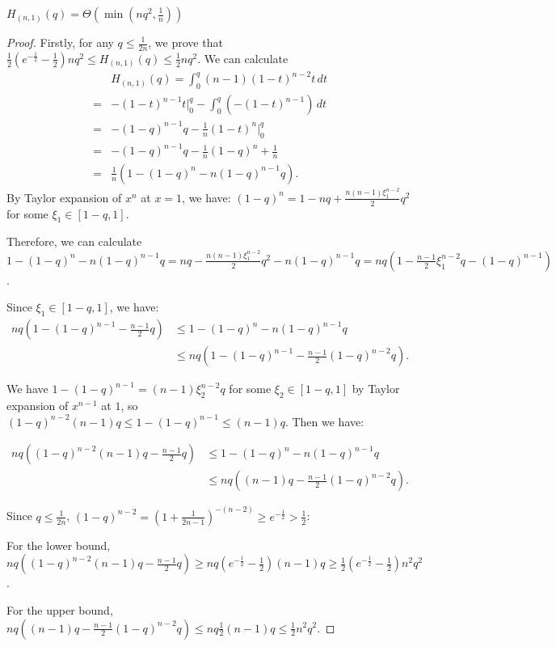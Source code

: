 \begin{lemma}\label{lem:Hn1}
    $H_{(n,1)}(q)=\Theta(\min(nq^2,\frac1{n}))$
\end{lemma}
\begin{proof}
   Firstly, for any $q\leq \frac1{2n}$, we prove that $\frac12(e^{-\frac12}-\frac12)nq^2\leq H_{(n,1)}(q)\leq \frac12nq^2$. We can calculate
   \begin{align*}
       &H_{(n,1)}(q)=\int_0^q (n-1) (1-t)^{n-2} t \, dt\\
=& -(1-t)^{n-1} t \Big|_0^q - \int_0^q \left( -(1-t)^{n-1} \right) \, dt\\
=& -(1-q)^{n-1} q - \frac{1}{n} (1-t)^n \Big|_0^q\\
=& -(1-q)^{n-1} q - \frac{1}{n} (1-q)^n + \frac{1}{n}\\
=& \frac{1}{n} \left( 1 - (1-q)^n - n(1-q)^{n-1} q \right).
   \end{align*}
    By Taylor expansion of $x^n$ at $x=1$, we have: $(1-q)^n=1-nq+\frac{n(n-1)\xi_1^{n-2}}{2}q^2$ for some $\xi_1\in[1-q,1]$.
    
   Therefore, we can calculate $1 - (1-q)^n - n(1-q)^{n-1} q
   =nq-\frac{n(n-1)\xi_1^{n-2}}{2}q^2-n(1-q)^{n-1} q
   =nq(1-\frac{n-1}{2}\xi_1^{n-2}q-(1-q)^{n-1})$. 
   
   Since $\xi_1\in[1-q,1]$, we have: 
   $$
   \begin{aligned}
       nq(1-(1-q)^{n-1}-\frac{n-1}{2}q) & \leq 1 - (1-q)^n - n(1-q)^{n-1} q\\ & \leq nq(1-(1-q)^{n-1}-\frac{n-1}{2}(1-q)^{n-2}q).
   \end{aligned}
   $$
   
   We have $1-(1-q)^{n-1}=(n-1)\xi_2^{n-2}q$ for some $\xi_2\in[1-q,1]$ by Taylor expansion of $x^{n-1}$ at $1$, so $(1-q)^{n-2}(n-1)q\leq 1-(1-q)^{n-1}\leq (n-1)q$. Then we have:
   
   $$
   \begin{aligned}
       nq((1-q)^{n-2}(n-1)q-\frac{n-1}{2}q) & \leq 1 - (1-q)^n - n(1-q)^{n-1} q \\ &\leq nq((n-1)q-\frac{n-1}{2}(1-q)^{n-2}q).
   \end{aligned}
   $$
   
   Since $q\leq\frac1{2n}$, $(1-q)^{n-2}=(1+\frac{1}{2n-1})^{-(n-2)}\geq e^{-\frac12}>\frac12$:

   For the lower bound, $nq((1-q)^{n-2}(n-1)q-\frac{n-1}{2}q)\geq nq(e^{-\frac12}-\frac12)(n-1)q\geq \frac12(e^{-\frac12}-\frac12)n^2q^2$.
   
   For the upper bound, $nq((n-1)q-\frac{n-1}{2}(1-q)^{n-2}q)\leq nq\frac12(n-1)q\leq\frac12n^2q^2$.


\end{proof}
